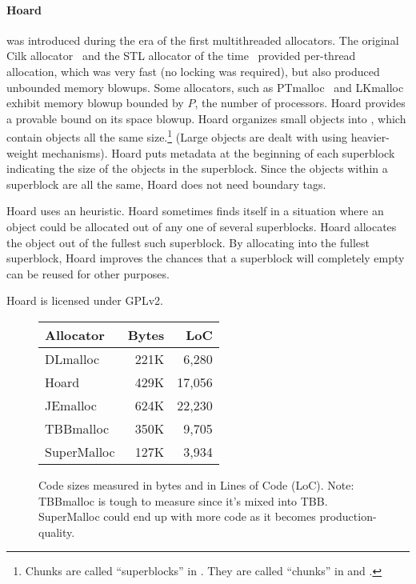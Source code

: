 \documentclass[pldi]{sigplanconf-pldi15}
\begin{document}
{\paragraph{Hoard}} \cite{BergerMcBl00} was introduced during the era
of the first multithreaded allocators.  The original Cilk
allocator~\cite{BlumofeLe94} and the STL allocator of the
time~\cite{SGI97} provided per-thread allocation, which was very fast
(no locking was required), but also produced unbounded memory blowups.
Some allocators, such as PTmalloc~\cite{Gloger06} and
LKmalloc~\cite{LarsonKr98} exhibit memory blowup bounded by $P$, the
number of processors.  Hoard provides a provable bound on its space
blowup.  Hoard organizes small objects into , which
contain objects all the same size.\footnote{Chunks are called
  ``superblocks'' in \cite{BergerMcBl00}.  They are called ``chunks''
  in \cite{Evans06} and \cite{KukanovVo07}.}  (Large objects are dealt
with using heavier-weight mechanisms).  Hoard puts metadata at the
beginning of each superblock indicating the size of the objects in the
superblock.  Since the objects within a superblock are all the same,
Hoard does not need boundary tags.

Hoard uses an  heuristic.  Hoard sometimes
finds itself in a situation where an object could be allocated out of
any one of several superblocks.  Hoard allocates the object out of the
fullest such superblock. By allocating into the fullest superblock,
Hoard improves the chances that a superblock will completely empty can
be reused for other purposes.

Hoard is licensed under GPLv2.

\begin{figure}
\begin{center}
\begin{tabular}{lrr}
Allocator & Bytes        & LoC \\ \hline
 DLmalloc    \cite{Lea96}        & 221K &  6,280 \\
 Hoard       \cite{BergerMcBl00} & 429K & 17,056 \\
 JEmalloc    \cite{Evans06}      & 624K & 22,230 \\
 TBBmalloc   \cite{KukanovVo07}  & 350K &  9,705 \\
 SuperMalloc                     & 127K &  3,934 \\
\end{tabular}
\end{center}
\caption{Code sizes measured in bytes and in Lines of Code (LoC).
  Note: TBBmalloc is tough to measure since it's mixed into TBB.
  SuperMalloc could end up with more code as it becomes
  production-quality.}
\label{fig:codesize}
\end{figure}
\end{document}
